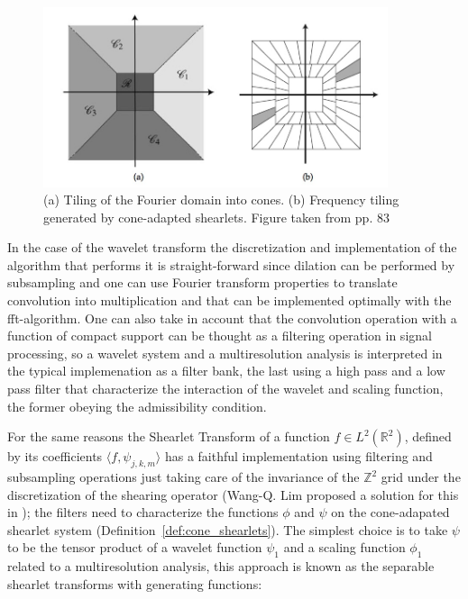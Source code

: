 \begin{figure}[!tbp]
  \centering
   \includegraphics[width=0.9\textwidth]{./Diagrams/tiling_cone.jpg}
    \caption{(a) Tiling of the Fourier domain into cones. (b) Frequency tiling generated by cone-adapted shearlets. Figure taken from \cite{Gitta-notes} pp. 83}
  \label{fig:tiling_cone}
\end{figure}

\bigskip

In the case of the wavelet transform the discretization and implementation of the algorithm that performs it is straight-forward since dilation can be performed by subsampling and one can use Fourier transform properties to translate convolution into multiplication and that can be implemented optimally with the fft-algorithm. One can also take in account that the convolution operation with a function of compact support can be thought as a filtering operation in signal processing, so a wavelet system and a multiresolution analysis  is interpreted in the typical implemenation as a filter bank, the last using a high pass and a low pass filter that characterize the interaction of the wavelet and scaling function, the former obeying the admissibility condition. 

\bigskip

For the same reasons the Shearlet Transform of a function $f\in L^2(\mathbb{R}^2)$, defined by its coefficients $\langle f,\psi_{j,k,m}\rangle$ has a faithful implementation using filtering and subsampling operations just taking care of the invariance of the $\mathbb{Z}^2$ grid under the discretization of the shearing operator (Wang-Q. Lim proposed a solution for this in \cite{Nonseparableshear}); the filters need to characterize the functions $\phi$ and $\psi$ on the cone-adapated shearlet system (Definition~\ref{def:cone_shearlets}). The simplest choice is to take $\psi$ to be the tensor product of a wavelet function $\psi_1$ and a scaling function $\phi_1$ related to a multiresolution analysis, this approach is known as the separable shearlet transforms with generating functions:

